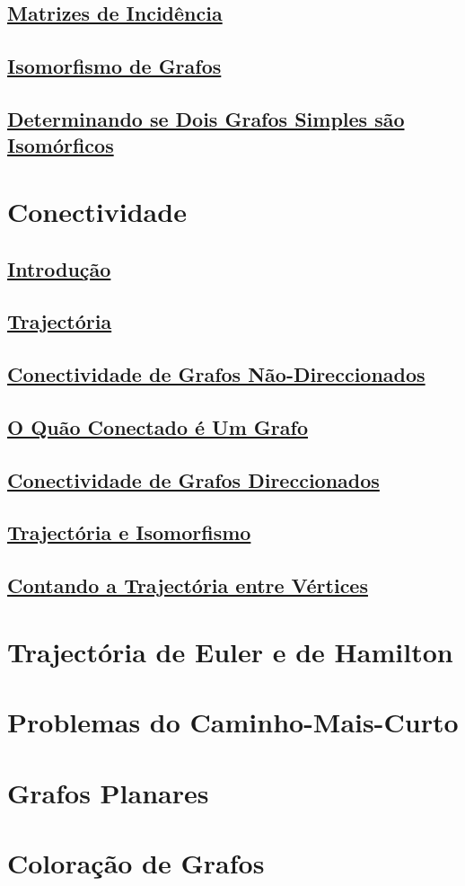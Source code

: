 \subsection*{\underline{Matrizes de Incidência}}
\subsection*{\underline{Isomorfismo de Grafos}}
\subsection*{\underline{Determinando se Dois Grafos Simples são Isomórficos}}

\section{Conectividade}
\subsection*{\underline{Introdução}}
\subsection*{\underline{Trajectória}}
\subsection*{\underline{Conectividade de Grafos Não-Direccionados}}
\subsection*{\underline{O Quão Conectado é Um Grafo}}
\subsection*{\underline{Conectividade de Grafos Direccionados}}
\subsection*{\underline{Trajectória e Isomorfismo}}
\subsection*{\underline{Contando a Trajectória entre Vértices}}

\section{Trajectória de Euler e de Hamilton}

\section{Problemas do Caminho-Mais-Curto}

\section{Grafos Planares}

\section{Coloração de Grafos}









